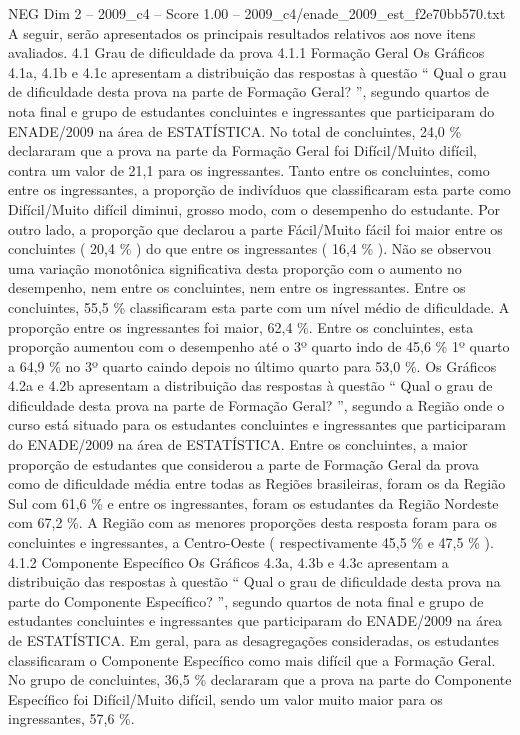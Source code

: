\begin{textsample}{NEG Dim 2 – 2009\_c4 – Score 1.00 – 2009\_c4/enade\_2009\_est\_f2e70bb570.txt}
A seguir, serão apresentados os principais resultados relativos aos nove itens avaliados. 4.1 Grau de dificuldade da prova 4.1.1 Formação Geral Os Gráficos 4.1a, 4.1b e 4.1c apresentam a distribuição das respostas à questão “ Qual o grau de dificuldade desta prova na parte de Formação Geral? ”, segundo quartos de nota final e grupo de estudantes concluintes e ingressantes que participaram do ENADE/2009 na área de ESTATÍSTICA.
No total de concluintes, 24,0 \% declararam que a prova na parte da Formação Geral foi Difícil/Muito difícil, contra um valor de 21,1 para os ingressantes.
Tanto entre os concluintes, como entre os ingressantes, a proporção de indivíduos que classificaram esta parte como Difícil/Muito difícil diminui, grosso modo, com o desempenho do estudante.
Por outro lado, a proporção que declarou a parte Fácil/Muito fácil foi maior entre os concluintes ( 20,4 \% ) do que entre os ingressantes ( 16,4 \% ).
Não se observou uma variação monotônica significativa desta proporção com o aumento no desempenho, nem entre os concluintes, nem entre os ingressantes.
Entre os concluintes, 55,5 \% classificaram esta parte com um nível médio de dificuldade.
A proporção entre os ingressantes foi maior, 62,4 \%.
Entre os concluintes, esta proporção aumentou com o desempenho até o 3º quarto indo de 45,6 \% 1º quarto a 64,9 \% no 3º quarto caindo depois no último quarto para 53,0 \%.
Os Gráficos 4.2a e 4.2b apresentam a distribuição das respostas à questão “ Qual o grau de dificuldade desta prova na parte de Formação Geral? ”, segundo a Região onde o curso está situado para os estudantes concluintes e ingressantes que participaram do ENADE/2009 na área de ESTATÍSTICA.
Entre os concluintes, a maior proporção de estudantes que considerou a parte de Formação Geral da prova como de dificuldade média entre todas as Regiões brasileiras, foram os da Região Sul com 61,6 \% e entre os ingressantes, foram os estudantes da Região Nordeste com 67,2 \%.
A Região com as menores proporções desta resposta foram para os concluintes e ingressantes, a Centro-Oeste ( respectivamente 45,5 \% e 47,5 \% ). 4.1.2 Componente Específico Os Gráficos 4.3a, 4.3b e 4.3c apresentam a distribuição das respostas à questão “ Qual o grau de dificuldade desta prova na parte do Componente Específico? ”, segundo quartos de nota final e grupo de estudantes concluintes e ingressantes que participaram do ENADE/2009 na área de ESTATÍSTICA.
Em geral, para as desagregações consideradas, os estudantes classificaram o Componente Específico como mais difícil que a Formação Geral.
No grupo de concluintes, 36,5 \% declararam que a prova na parte do Componente Específico foi Difícil/Muito difícil, sendo um valor muito maior para os ingressantes, 57,6 \%.

\end{textsample}

